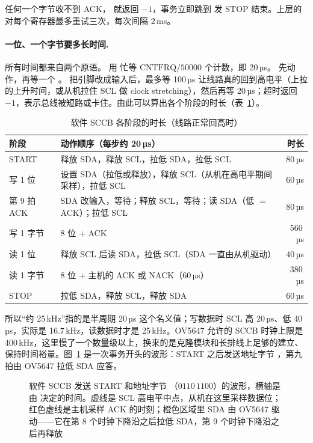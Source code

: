 任何一个字节收不到 ACK， 就返回 $-1$，事务立即跳到  发 STOP 结束。上层的  对每个寄存器最多重试三次，每次间隔 2\,ms。

\paragraph{一位、一个字节要多长时间.} 所有时间都来自两个原语。 用  忙等 $\text{CNTFRQ}/50000$ 个计数，即 20\,µs。 先动作，再等一个 。 把引脚改成输入后，最多等 100\,µs 让线路真的回到高电平（上拉的上升时间，或从机拉住 SCL 做 clock stretching），然后再等 20\,µs；超时返回 $-1$，表示总线被短路或卡住。由此可以算出各个阶段的时长（表~\ref{tab:sccb-timing}）。

\begin{table}[htbp]
  \centering
  \caption{软件 SCCB 各阶段的时长（线路正常回高时）}
  \label{tab:sccb-timing}
  \small
  \begin{tabularx}{\linewidth}{@{}lXr@{}}
    \toprule
    阶段 & 动作顺序（每步约 20\,µs） & 时长 \\
    \midrule
    START & 释放 SDA，释放 SCL，拉低 SDA，拉低 SCL & 80\,µs \\
    写 1 位 & 设置 SDA（拉低或释放），释放 SCL（从机在高电平期间采样），拉低 SCL & 60\,µs \\
    第 9 拍 ACK & SDA 改输入，等待；释放 SCL，等待；读 SDA（低 $=$ ACK）；拉低 SCL & 80\,µs \\
    写 1 字节 & 8 位 $+$ ACK & 560\,µs \\
    读 1 位 & 释放 SCL 后读 SDA，拉低 SCL（SDA 一直由从机驱动） & 40\,µs \\
    读 1 字节 & 8 位 $+$ 主机的 ACK 或 NACK（60\,µs） & 380\,µs \\
    STOP & 拉低 SDA，释放 SCL，释放 SDA & 60\,µs \\
    \bottomrule
  \end{tabularx}
\end{table}

所以“约 25\,kHz”指的是半周期 20\,µs 这个名义值；写数据时 SCL 高 20\,µs、低 40\,µs，实际是 16.7\,kHz，读数据时才是 25\,kHz。OV5647 允许的 SCCB 时钟上限是 400\,kHz，这里慢了一个数量级以上，换来的是克隆模块和长排线上足够的建立、保持时间裕量。图~\ref{fig:sccb-wave} 是一次事务开头的波形：START 之后发送地址字节 ，第九拍由 OV5647 拉低 SDA 应答。

\begin{figure}[htbp]
  \centering
  
  \caption{软件 SCCB 发送 START 和地址字节 （$0110\,1100$）的波形，横轴是由  决定的时间。虚线是 SCL 高电平中点，从机在这里采样数据位；红色虚线是主机采样 ACK 的时刻；橙色区域里 SDA 由 OV5647 驱动——它在第 8 个时钟下降沿之后拉低 SDA，第 9 个时钟下降沿之后再释放}
  \label{fig:sccb-wave}
\end{figure}


